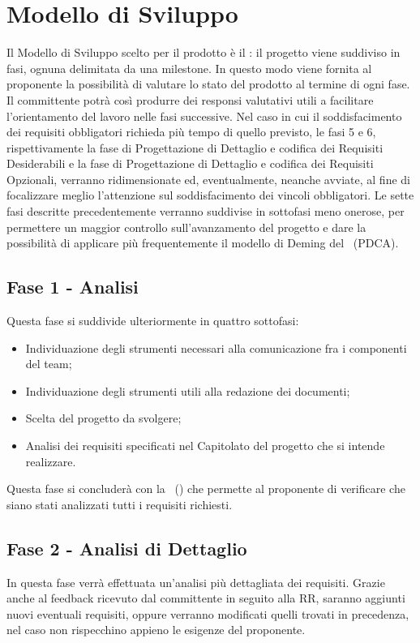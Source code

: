 \documentclass[../PianoDiProgetto.tex]{subfiles}
\begin{document}
\section{Modello di Sviluppo}
Il Modello di Sviluppo scelto per il prodotto è il : il progetto viene suddiviso in fasi, ognuna delimitata da una milestone. In questo modo viene fornita al proponente la possibilità di valutare lo stato del prodotto al termine di ogni fase. Il committente potrà così produrre dei responsi valutativi utili a facilitare l'orientamento del lavoro nelle fasi successive. Nel caso in cui il soddisfacimento dei requisiti obbligatori richieda più tempo di quello previsto, le fasi 5 e 6, rispettivamente la fase di Progettazione di Dettaglio e codifica dei Requisiti Desiderabili e la fase di Progettazione di Dettaglio e codifica dei Requisiti Opzionali, verranno ridimensionate ed, eventualmente, neanche avviate, al fine di focalizzare meglio l'attenzione sul soddisfacimento dei vincoli obbligatori. Le sette fasi descritte precedentemente verranno suddivise in sottofasi meno onerose, per permettere un maggior controllo sull’avanzamento del progetto e dare la possibilità di applicare più frequentemente il modello di Deming del \ (PDCA).

	\subsection{Fase 1 - Analisi}
	Questa fase si suddivide ulteriormente in quattro sottofasi:

	\begin{itemize}
		\item Individuazione degli strumenti necessari alla comunicazione fra i componenti del team;
		\item Individuazione degli strumenti utili alla redazione dei documenti;
		\item Scelta del progetto da svolgere;
		\item Analisi dei requisiti specificati nel Capitolato del progetto che si intende realizzare.
	\end{itemize}
			
	Questa fase si concluderà con la \revisionedeirequisiti\ () che permette al proponente di verificare che siano stati analizzati tutti i requisiti richiesti.
			
	\subsection{Fase 2 - Analisi di Dettaglio}
	In questa fase verrà effettuata un'analisi più dettagliata dei requisiti. Grazie anche al feedback ricevuto dal committente in seguito alla RR, saranno aggiunti nuovi eventuali requisiti, oppure verranno modificati quelli trovati in precedenza, nel caso non rispecchino appieno le esigenze del proponente.
		
\end{document}
